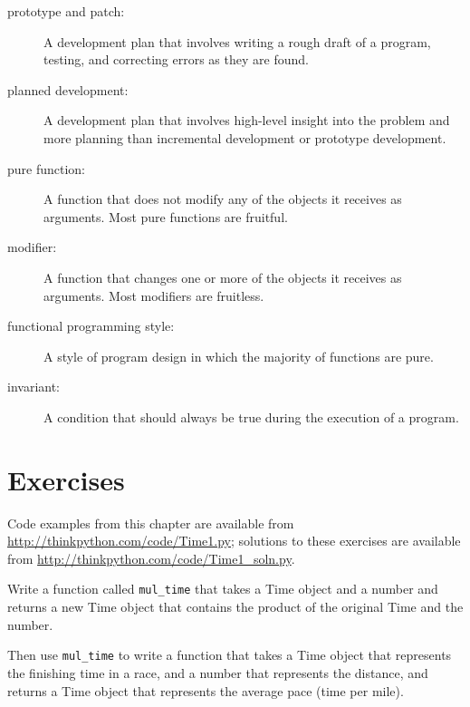 \documentclass[10pt]{book}
\begin{document}
\begin{description}

\item[prototype and patch:] A development plan that involves
writing a rough draft of a program, testing, and correcting errors as
they are found.

\item[planned development:] A development plan that involves
high-level insight into the problem and more planning than incremental
development or prototype development.

\item[pure function:] A function that does not modify any of the objects it
receives as arguments.  Most pure functions are fruitful.

\item[modifier:] A function that changes one or more of the objects it
receives as arguments.  Most modifiers are fruitless.

\item[functional programming style:] A style of program design in which the
majority of functions are pure.

\item[invariant:] A condition that should always be true during the
execution of a program.

\end{description}


\section{Exercises}

Code examples from this chapter are available from
\url{http://thinkpython.com/code/Time1.py}; solutions to these
exercises are available from \url{http://thinkpython.com/code/Time1_soln.py}.

\begin{exercise}

Write a function called \verb"mul_time" that takes a Time object
and a number and returns a new Time object that contains
the product of the original Time and the number.

Then use \verb"mul_time" to write a function that takes a Time
object that represents the finishing time in a race, and a number
that represents the distance, and returns a Time object that represents
the average pace (time per mile).

\end{exercise}
\end{document}
